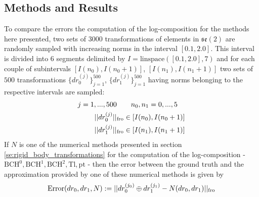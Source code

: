 \subsection{Methods and Results}

To compare the errors the computation of the log-composition for the methods here presented, two sets of $3000$ transformations of elements in $\mathfrak{se}(2)$ are randomly sampled with increasing norms in the interval $[0.1, 2.0]$. This interval is divided into 6 segments delimited by $ I = \text{linspace}([0.1, 2.0], 7)$ and for each couple of subintervals $[I(n_0), I(n_0+1)]$, $[I(n_1), I(n_1+1)]$ two sets of $500$ transformations $\{ dr_{0}^{(j)}\}_{j=1}^{500}$, $\{ dr_{1}^{(j)} \}_{j=1}^{500}$ having norms belonging to the respective intervals are sampled:
\begin{align*}
j=1,...,500 \quad &\quad  n_0, n_1 = 0,...,5 \\
\vert\lvert dr_{0}^{(j)} \rvert\vert_{\text{fro}} &\in [I(n_0), I(n_0+1)] \\
\vert\lvert dr_{1}^{(j)} \rvert\vert_{\text{fro}} &\in [I(n_1), I(n_1+1)]  
\end{align*} 
If $N$ is one of the numerical methods presented in section \ref{se:rigid_body_transformations} for the computation of the log-composition - $\text{BCH}^{0}, \text{BCH}^{1}, \text{BCH}^{2}, \text{Tl}, \text{pt}$ - 
then the error between the ground truth and the approximation provided by one of these numerical methods is given by
\begin{align*}
\text{Error}(dr_{0},dr_{1},N) 
:= 
\vert\lvert dr_{0}^{(j_0)} \oplus dr_{1}^{(j_1)} 
- 
N(dr_{0}, dr_{1})  \rvert\vert_{\text{fro}} 
\end{align*}

